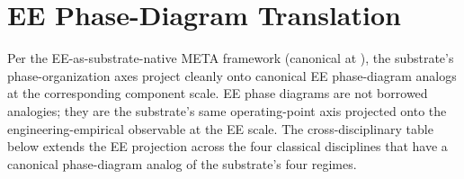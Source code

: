 \section{EE Phase-Diagram Translation}
\label{sec:vol9_phase_ee_translation}

Per the EE-as-substrate-native META framework (canonical at ), the substrate's phase-organization axes project cleanly onto canonical EE phase-diagram analogs at the corresponding component scale. EE phase diagrams are not borrowed analogies; they are the substrate's same operating-point axis projected onto the engineering-empirical observable at the EE scale. The cross-disciplinary table below extends the EE projection across the four classical disciplines that have a canonical phase-diagram analog of the substrate's four regimes.

